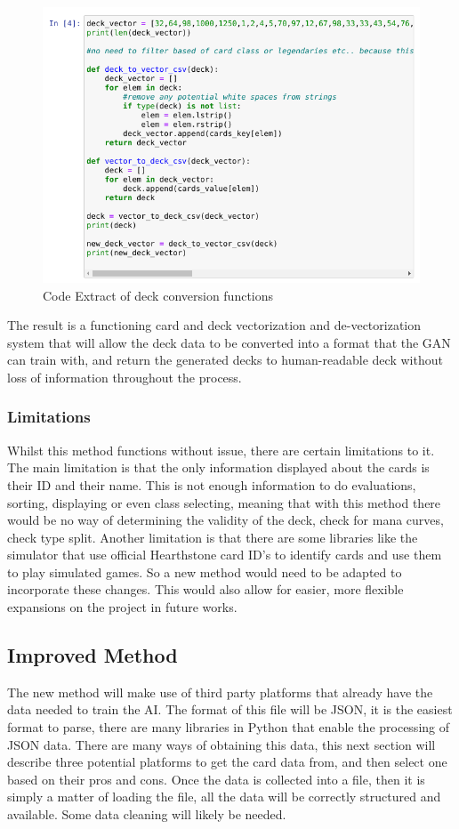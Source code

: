 \documentclass{report} %
\begin{document}
\begin{figure}[H]
\centering
\includegraphics[width=1\textwidth]{deckConversion}
\caption{Code Extract of deck conversion functions\protect}
\label{board}
\end{figure}

The result is a functioning card and deck vectorization and de-vectorization system that will allow the deck data to be converted into a format that the GAN can train with, and return the generated decks to human-readable deck without loss of information throughout the process.
\subsubsection{Limitations}

Whilst this method functions without issue, there are certain limitations to it. The main limitation is that the only information displayed about the cards is their ID and their name. This is not enough information to do evaluations, sorting, displaying or even class selecting, meaning that with this method there would be no way of determining the validity of the deck, check for mana curves, check type split. Another limitation is that there are some libraries like the simulator that use official Hearthstone card ID's to identify cards and use them to play simulated games. So a new method would need to be adapted to incorporate these changes. This would also allow for easier, more flexible expansions on the project in future works.
\subsection{Improved Method}
The new method will make use of third party platforms that already have the data needed to train the AI. The format of this file will be JSON, it is the easiest format to parse, there are many libraries in Python that enable the processing of JSON data. There are many ways of obtaining this data, this next section will describe three potential platforms to get the card data from, and then select one based on their pros and cons. Once the data is collected into a file, then it is simply a matter of loading the file, all the data will be correctly structured and available. Some data cleaning will likely be needed.
\end{document}

